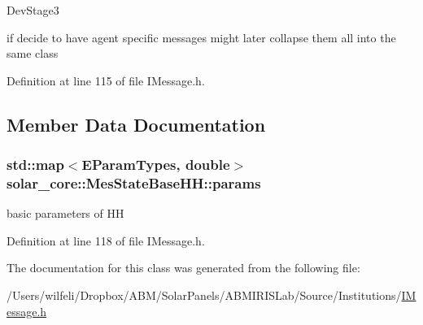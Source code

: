 \begin{DoxyRefDesc}{Dev\+Stage3}
\item[\hyperlink{_dev_stage3__DevStage3000004}{Dev\+Stage3}]if decide to have agent specific messages might later collapse them all into the same class\end{DoxyRefDesc}


Definition at line 115 of file I\+Message.\+h.



\subsection{Member Data Documentation}
\hypertarget{classsolar__core_1_1_mes_state_base_h_h_a75575469dfbf7a86bd1ea95fb85c5194}{}
\subsubsection[{params}]{\setlength{\rightskip}{0pt plus 5cm}std\+::map$<${\bf E\+Param\+Types}, double$>$ solar\+\_\+core\+::\+Mes\+State\+Base\+H\+H\+::params}\label{classsolar__core_1_1_mes_state_base_h_h_a75575469dfbf7a86bd1ea95fb85c5194}
basic parameters of H\+H 

Definition at line 118 of file I\+Message.\+h.



The documentation for this class was generated from the following file\+:\begin{DoxyCompactItemize}
\item 
/\+Users/wilfeli/\+Dropbox/\+A\+B\+M/\+Solar\+Panels/\+A\+B\+M\+I\+R\+I\+S\+Lab/\+Source/\+Institutions/\hyperlink{_i_message_8h}{I\+Message.\+h}\end{DoxyCompactItemize}
